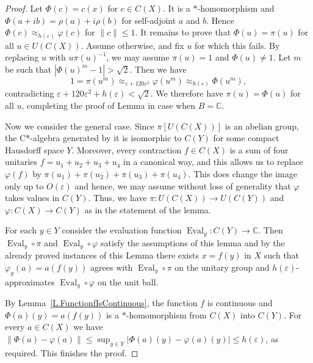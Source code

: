\documentclass[11pt]{amsproc}
\DeclareMathOperator{\Eval}{Eval}
\newcommand{\cstar}{C*}
\newcommand{\bbC}{\mathbb C}
\theoremstyle{definition}
\theoremstyle{plain}
\theoremstyle{remark}
\begin{document}
\begin{proof}
	Let $\Phi(c)=c(x)$ for $c\in C(X)$. It is a $*$-homomorphism and $\Phi(a+ib)=\rho(a)+i\rho(b)$ for self-adjoint $a$ and $b$. 
	Hence $\Phi(c)\approx_{h(\varepsilon)} \varphi(c)$ for $\|c\|\leq 1$. 
	It remains to prove that $\Phi(u)=\pi(u)$ for all $u\in U(C(X))$. Assume otherwise, and fix $u$ for which this fails. By replacing $u$ with $u\pi(u)^{-1}$, we may assume $\pi(u)=1$ and $\Phi(u)\neq 1$. Let $m$ be such that $|\Phi(u)^m-1|>\sqrt 2$. 
	Then we have 
	\[
	1=\pi(u^m)\approx_{\varepsilon+120\varepsilon^2} \varphi(u^m)\approx_{h(\varepsilon)} \Phi(u^m),
	\]
	contradicting $\varepsilon+120\varepsilon^2+h(\varepsilon)<\sqrt 2$. 
	We therefore have $\pi(u)=\Phi(u)$ for all $u$,  
	completing the proof of Lemma  in case when $B=\bbC$. 
	
\medskip

	Now we consider the general case.  Since $\pi[U(C(X))]$ is an abelian group, the \cstar-algebra generated by it is isomorphic to $C(Y)$ for some compact Hausdorff space $Y$. Moreover, every contraction $f \in C(X)$ is a sum of four unitaries $f = u_1 + u_2 + u_3 + u_4$ in a canonical way, and this allows us to replace $\varphi(f)$ by $\pi(u_1) + \pi(u_2) + \pi(u_3) + \pi(u_4)$. This does change the image only up to $O(\varepsilon)$ and hence, we may assume without loss of generality that $\varphi$ takes values in $C(Y).$ 
    Thus, we have $\pi\colon U(C(X))\to U(C(Y))$ and $\varphi \colon C(X)\to C(Y)$ as in the statement of the lemma. 
    
	For each $y\in Y$ consider the evaluation function $\Eval_y\colon C(Y)\to \bbC$. 
	Then $\Eval_y \circ \pi$ and $\Eval_y \circ \varphi$ satisfy the assumptions of this lemma and by the already proved instances of this Lemma   there exists $x=f(y)$ in $X$ such that $\varphi_y(a)=a(f(y))$ agrees with $\Eval_y \circ \pi$ on the unitary group and $h(\varepsilon)$-approximates $\Eval_y \circ \varphi$ on the unit ball. 
	
	By Lemma~\ref{L.FunctionfIsContinuous}, the function $f$ is continuous and $\Phi(a)(y)=a(f(y))$ is a $*$-homomorphism from $C(X)$ into $C(Y)$. For every $a\in C(X)$ we have $\|\Phi(a)-\varphi(a)\|\leq \sup_{y\in Y} |\Phi(a)(y)-\varphi(a)(y)|\leq h(\varepsilon)$, as required. This finishes the proof.
\end{proof}
\end{document}
